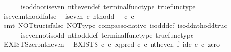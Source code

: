 \begin{isabellebody}
\ \ \ \ \ \ is{\isacharunderscore}{\kern0pt}odd{\isacharunderscore}{\kern0pt}not{\isacharunderscore}{\kern0pt}is{\isacharunderscore}{\kern0pt}even\ nth{\isacharunderscore}{\kern0pt}even{\isacharunderscore}{\kern0pt}def{}\ terminal{\isacharunderscore}{\kern0pt}func{\isacharunderscore}{\kern0pt}type\ true{\isacharunderscore}{\kern0pt}func{\isacharunderscore}{\kern0pt}type{\isacharparenright}{\kern0pt}%
\endisatagproof
{\isafoldproof}%
%
\isadelimproof
\isanewline
%
\endisadelimproof
\isanewline
{}\isamarkupfalse%
\ is{\isacharunderscore}{\kern0pt}even{\isacharunderscore}{\kern0pt}nth{\isacharunderscore}{\kern0pt}odd{\isacharunderscore}{\kern0pt}false{\isacharcolon}{\kern0pt}\isanewline
\ \ {\isachardoublequoteopen}is{\isacharunderscore}{\kern0pt}even\ {\isasymcirc}\isactrlsub c\ nth{\isacharunderscore}{\kern0pt}odd\ {\isacharequal}{\kern0pt}\ {\isasymf}\ {\isasymcirc}\isactrlsub c\ {\isasymbeta}\isactrlbsub {\isasymnat}\isactrlsub c\isactrlesub {\isachardoublequoteclose}\isanewline
%
\isadelimproof
\ \ %
\endisadelimproof
%
\isatagproof
{}\isamarkupfalse%
\ {\isacharparenleft}{\kern0pt}smt\ NOT{\isacharunderscore}{\kern0pt}true{\isacharunderscore}{\kern0pt}is{\isacharunderscore}{\kern0pt}false\ NOT{\isacharunderscore}{\kern0pt}type\ comp{\isacharunderscore}{\kern0pt}associative{}\ is{\isacharunderscore}{\kern0pt}odd{\isacharunderscore}{\kern0pt}def{}\ is{\isacharunderscore}{\kern0pt}odd{\isacharunderscore}{\kern0pt}nth{\isacharunderscore}{\kern0pt}odd{\isacharunderscore}{\kern0pt}true\isanewline
\ \ \ \ \ \ is{\isacharunderscore}{\kern0pt}even{\isacharunderscore}{\kern0pt}not{\isacharunderscore}{\kern0pt}is{\isacharunderscore}{\kern0pt}odd\ nth{\isacharunderscore}{\kern0pt}odd{\isacharunderscore}{\kern0pt}def{}\ terminal{\isacharunderscore}{\kern0pt}func{\isacharunderscore}{\kern0pt}type\ true{\isacharunderscore}{\kern0pt}func{\isacharunderscore}{\kern0pt}type{\isacharparenright}{\kern0pt}%
\endisatagproof
{\isafoldproof}%
%
\isadelimproof
\isanewline
%
\endisadelimproof
\isanewline
{}\isamarkupfalse%
\ EXISTS{\isacharunderscore}{\kern0pt}zero{\isacharunderscore}{\kern0pt}nth{\isacharunderscore}{\kern0pt}even{\isacharcolon}{\kern0pt}\isanewline
\ \ {\isachardoublequoteopen}{\isacharparenleft}{\kern0pt}EXISTS\ {\isasymnat}\isactrlsub c\ {\isasymcirc}\isactrlsub c\ {\isacharparenleft}{\kern0pt}eq{\isacharunderscore}{\kern0pt}pred\ {\isasymnat}\isactrlsub c\ {\isasymcirc}\isactrlsub c\ nth{\isacharunderscore}{\kern0pt}even\ {\isasymtimes}\isactrlsub f\ id\isactrlsub c\ {\isasymnat}\isactrlsub c{\isacharparenright}{\kern0pt}\isactrlsup {\isasymsharp}{\isacharparenright}{\kern0pt}\ {\isasymcirc}\isactrlsub c\ zero\ {\isacharequal}{\kern0pt}\ {\isasymt}{\isachardoublequoteclose}\isanewline

\end{isabellebody}

